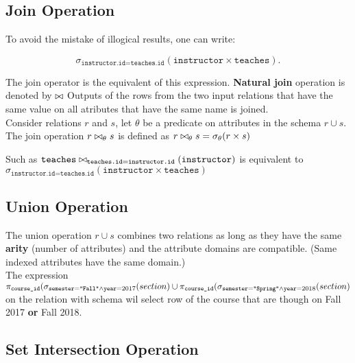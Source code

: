 \documentclass[11pt,a4paper,twocolumn]{book}
\begin{document}
\subsection{Join Operation}

To avoid the mistake of illogical results, one can write:

\begin{equation}
\sigma_{\texttt{instructor.id}=\texttt{teaches.id}}(\texttt{instructor}\times\texttt{teaches}).
\end{equation}

The join operator is the equivalent of this expression. \textbf{Natural join} operation is denoted by $\bowtie$ Outputs of the rows from the two input relations that have the same value on all atributes that have the same name is joined.\\

Consider relations $r$ and $s$, let $\theta$ be a predicate on attributes in the schema $r \cup s$. The join operation $r \bowtie_\theta s$ is defined as $r \bowtie_\theta s = \sigma_\theta (r \times s)$

Such as $\texttt{teaches} \bowtie_{\texttt{teaches.id} = \texttt{instructor.id}}( \texttt{instructor})$ is equivalent to $\sigma_{\texttt{instructor.id}=\texttt{teaches.id}}(\texttt{instructor} \times \texttt{teaches})$

\subsection{Union Operation}

The union operation $r \cup s$ combines two relations as long as they have the same \textbf{arity} (number of attributes) and the attribute domains are compatible. (Same indexed attributes have the same domain.)\\

The expression $\pi_{\texttt{course\_id}}(\sigma_{\texttt{semester}=\texttt{"Fall"} \land \texttt{year} = 2017}(section) \cup \pi_{\texttt{course\_id}}(\sigma_{\texttt{semester} = \texttt{"Spring"} \land \texttt{year} = 2018}(section)$ on the relation  with schema  wil select  row of the course that are though on Fall 2017 \textbf{or} Fall 2018.

\subsection{Set Intersection Operation}
\end{document}
